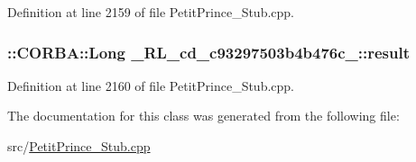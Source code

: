 Definition at line 2159 of file Petit\+Prince\+\_\+\+Stub.\+cpp.

\subsubsection[{\texorpdfstring{result}{result}}]{\setlength{\rightskip}{0pt plus 5cm}\+::C\+O\+R\+B\+A\+::\+Long \+\_\+R\+L\+\_\+cd\+\_\+c93297503b4b476c\+\_\+::result}\hypertarget{class__0_r_l__cd__c93297503b4b476c__31000000_a6e7a1986f3ea1dda54668466a335a2e2}{}\label{class__0_r_l__cd__c93297503b4b476c__31000000_a6e7a1986f3ea1dda54668466a335a2e2}


Definition at line 2160 of file Petit\+Prince\+\_\+\+Stub.\+cpp.



The documentation for this class was generated from the following file\+:\begin{DoxyCompactItemize}
\item 
src/\hyperlink{_petit_prince___stub_8cpp}{Petit\+Prince\+\_\+\+Stub.\+cpp}\end{DoxyCompactItemize}
